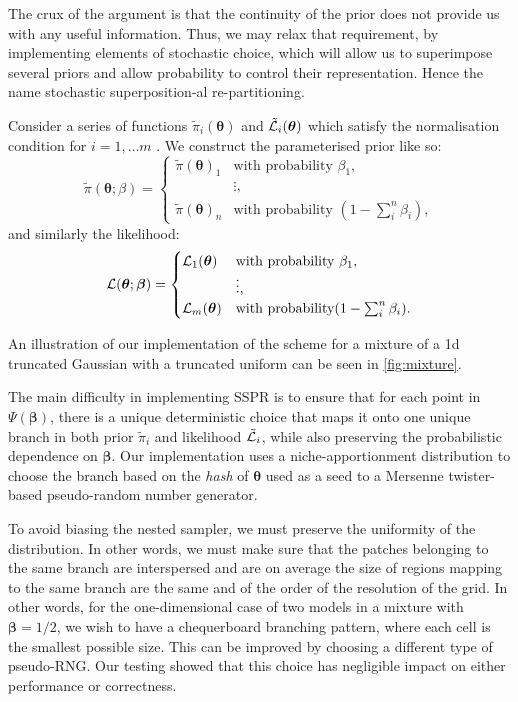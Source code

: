 \documentclass[usenatbib]{mnras}
\begin{document}
The crux of the argument is that the continuity of the prior does
not provide us with any useful information. Thus, we may relax
that requirement, by implementing elements of stochastic choice,
which will allow us to superimpose several priors and allow
probability to control their representation. Hence the name
stochastic superposition-al re-partitioning.

Consider a series of functions \(\tilde{\pi}_{i}(\bm{\theta})\)
and \({\cal \tilde{L}}_{i}(\bm{\theta})\) which satisfy the
normalisation condition for \(i = 1, \ldots m\) . We construct the
parameterised prior like so:
\begin{equation*}
  \tilde{\pi}(\bm{\theta}; \beta)  = \begin{cases}
	\tilde{\pi}(\bm{\theta})_{1} & \text{with probability } \beta_{1},\\
	& \vdots,\\
	\tilde{\pi}(\bm{\theta})_{n} & \text{with probability } (1- \sum_{i}^{n}\beta_{i}),
	\end{cases}
\end{equation*}
and similarly the likelihood:
\begin{equation*}
  {\cal L}(\bm{\theta}; \bm{\beta})  = \begin{cases}
	{\cal L}_{1}(\bm{\theta}) &  \text{with probability } \beta_{1},\\
		    &\vdots,\\
	{\cal L}_{m}(\bm{\theta}) & \text{with probability} (1- \sum_{i}^{n}\beta_{i}).
	\end{cases}
\end{equation*}

An illustration of our implementation of the scheme for a mixture
of a 1d truncated Gaussian with a truncated uniform can be seen in
\autoref{fig:mixture}.

The main difficulty in implementing SSPR is to ensure that
for each point in \(\Psi(\bm{\beta})\), there is a unique deterministic choice
that maps it onto one unique branch in both prior
\(\tilde{\pi}_{i}\) and likelihood \(\tilde{\cal L}_{i}\), while also
preserving the probabilistic dependence on \(\bm{\beta}\). Our
implementation uses a niche-apportionment distribution to choose
the branch based on the \emph{hash} of \(\bm{\theta}\) used as a seed to
a Mersenne twister-based pseudo-random number generator.

To avoid biasing the nested sampler, we must preserve the
uniformity of the distribution. In other words, we must make sure
that the patches belonging to the same branch are interspersed and
are on average the size of regions mapping to the same branch are
the same and of the order of the resolution of the grid. In other
words, for the one-dimensional case of two models in a mixture
with \(\bm{\beta}=1/2\), we wish to have a chequerboard branching
pattern, where each cell is the smallest possible size. This
can be improved by choosing a different type of pseudo-RNG. Our
testing showed that this choice has negligible impact on either
performance or correctness.
\end{document}
